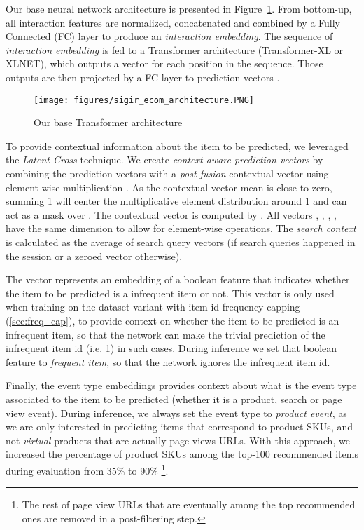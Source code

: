 \documentclass[sigconf,screen]{acmart}
\begin{document}
Our base neural network architecture is presented in Figure~\ref{fig:architecture}. From bottom-up, all interaction features are normalized, concatenated and combined by a Fully Connected (FC) layer to produce an \emph{interaction embedding}. The sequence of \emph{interaction embedding} is fed to a Transformer architecture (Transformer-XL or XLNET), which outputs a vector for each position in the sequence. Those outputs are then projected by a FC layer to prediction vectors .

\begin{figure}[ht]
  \centering
  \texttt{[image: figures/sigir\_ecom\_architecture.PNG]}
  \caption{Our base Transformer architecture}
  \label{fig:architecture}
  
\end{figure}


To provide contextual information about the item to be predicted, we leveraged the \emph{Latent Cross} \cite{beutel2018latent} technique. We create \emph{context-aware prediction vectors}  by combining the prediction vectors  with a \emph{post-fusion} contextual vector  using element-wise multiplication . As the contextual vector mean is close to zero, summing 1 will center the multiplicative element distribution around 1 and can act as a mask over . The contextual vector is computed by . All vectors , , , ,  have the same dimension  to allow for element-wise operations. The \emph{search context}  is calculated as the average of search query vectors (if search queries happened in the session or a zeroed vector otherwise). 

The  vector represents an embedding of a boolean feature that indicates whether the item to be predicted is a infrequent item or not. This vector is only used when training on the dataset variant with item id frequency-capping (\cref{sec:freq_cap}), to provide context on whether the item to be predicted is an infrequent item, so that the network can make the trivial prediction of the infrequent item id (i.e. 1) in such cases. During inference we set that boolean feature to \emph{frequent item}, so that the network ignores the infrequent item id.

Finally, the event type embeddings  provides context about what is the event type associated to the item to be predicted (whether it is a product, search or page view event). During inference, we always set the event type to \emph{product event}, as we are only interested in predicting items that correspond to product SKUs, and not \emph{virtual} products that are actually page views URLs. With this approach, we increased the percentage of product SKUs among the top-100 recommended items during evaluation from 35\% to 90\% \footnote{The rest of page view URLs that are eventually among the top recommended ones are removed in a post-filtering step.}.
\end{document}

